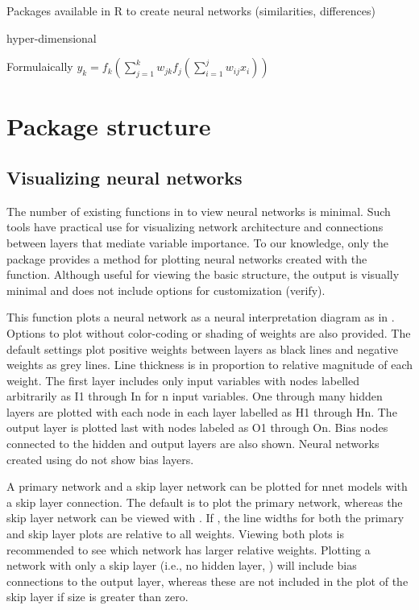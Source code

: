 \documentclass[article]{jss}\usepackage[]{graphicx}\usepackage[]{color}
\begin{document}
Packages available in R to create neural networks (similarities, differences)

hyper-dimensional

Formulaically \citep{Ripley96}
$y_k = f_k \left(\sum\limits_{j=1}^k w_{jk}f_j \left( \sum\limits_{i=1}^j w_{ij}x_i\right) \right) $

\section[Package structure]{Package structure}



\subsection{Visualizing neural networks}

The number of existing functions in  to view neural networks is minimal.  Such tools have practical use for visualizing network architecture and connections between layers that mediate variable importance. To our knowledge, only the  package provides a method for plotting neural networks created with the  function.  Although useful for viewing the basic structure, the output is visually minimal and does not include options for customization (verify).

This function plots a neural network as a neural interpretation diagram as in \citet{Ozesmi99}. Options to plot without color-coding or shading of weights are also provided. The default settings plot positive weights between layers as black lines and negative weights as grey lines. Line thickness is in proportion to relative magnitude of each weight. The first layer includes only input variables with nodes labelled arbitrarily as I1 through In for n input variables. One through many hidden layers are plotted with each node in each layer labelled as H1 through Hn. The output layer is plotted last with nodes labeled as O1 through On. Bias nodes connected to the hidden and output layers are also shown. Neural networks created using  do not show bias layers.

A primary network and a skip layer network can be plotted for nnet models with a skip layer connection. The default is to plot the primary network, whereas the skip layer network can be viewed with . If , the line widths for both the primary and skip layer plots are relative to all weights. Viewing both plots is recommended to see which network has larger relative weights. Plotting a network with only a skip layer (i.e., no hidden layer, ) will include bias connections to the output layer, whereas these are not included in the plot of the skip layer if size is greater than zero.
\end{document}
